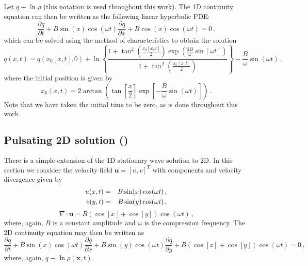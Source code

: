 \documentclass[11pt]{book}
\begin{document}
Let $q \equiv \ln \rho$ (this notation is used throughout this work).  The 1D continuity equation can then be written as the following linear hyperbolic PDE:
\begin{equation}
\label{eqn_cont1d}
\frac{\partial q}{\partial t} + B \sin(x) \cos(\omega t) \frac{\partial q}{\partial x} + B \cos(x) \cos(\omega t) = 0 \,\mbox{,}
\end{equation}
which can be solved using the method of characteristics to obtain the solution
\begin{equation}
\label{eqn_1dsoln}
q(x,t) = q(x_0[x,t],0) + \ln \left\{ \frac{ 1 + \tan^2\left(\frac{x_0[x,t]}{2}\right) \exp\left(\frac{2B}{\omega}\sin[\omega t]\right) }{ 1 + \tan^2\left(\frac{x_0[x,t]}{2}\right) } \right\} - \frac{B}{\omega} \sin(\omega t) \,\mbox{,}
\end{equation}
where the initial position is given by
\begin{equation}
\label{eqn_initialposition1d}
x_0(x,t) = 2 \arctan\left( \tan\left[\frac{x}{2}\right] \exp\left[-\frac{B}{\omega}\sin(\omega t)\right] \right) \,\mbox{.}
\end{equation}
Note that we have taken the initial time to be zero, as is done throughout this work.


\subsection{Pulsating 2D solution (\texorpdfstring{}{pulsating})}
\label{soln_2d}

There is a simple extension of the 1D stationary wave solution to 2D. In this section we consider the velocity field $\mathbf{u}=[u,v]^T$ with components and velocity divergence given by
\begin{eqnarray}
\label{eqn_u2d}
u(x,t) &=& B \sin(x) \cos(\omega t) \,\mbox{,} \vspace{0.2cm}\\
v(y,t) &=& B \sin(y) \cos(\omega t) \,\mbox{,}
\end{eqnarray}
\begin{equation}
\label{eqn_div2d}
\nabla\cdot\mathbf{u} = B(\cos[x] + \cos[y]) \cos(\omega t) \,\mbox{,}
\end{equation}
where, again, $B$ is a constant amplitude and $\omega$ is the compression frequency.  The 2D continuity equation may then be written as
\begin{equation}
\label{eqn_cont2d}
\frac{\partial q}{\partial t} + B \sin(x) \cos(\omega t) \frac{\partial q}{\partial x} + B \sin(y) \cos(\omega t) \frac{\partial q}{\partial y} + B( \cos[x] + \cos[y]) \cos(\omega t) = 0 \,\mbox{,}
\end{equation}
where, again, $q \equiv \ln \rho(\mathbf{x},t)$.
\end{document}
